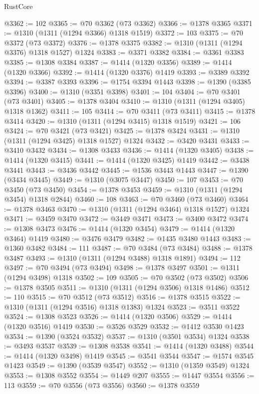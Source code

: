 \begin{lexlean}{RustCore}
\begin{coremodule}
@3362 := 102
@3365 := @70 @3362 (@73 @3362)
@3366 := @1378 @3365
@3371 := @1310 (@1311 (@1294 @3366) @1318 @1519)
@3372 := 103
@3375 := @70 @3372 (@73 @3372)
@3376 := @1378 @3375
@3382 := @1310 (@1311 (@1294 @3376) @1318 @1527) @1324
@3383 := @3371 @3382
@3384 := @3361 @3383
@3385 := @1308 @3384
@3387 := @1414 (@1320 @3356)
@3389 := @1414 (@1320 @3366)
@3392 := @1414 (@1320 @3376) @1419
@3393 := @3389 @3392
@3394 := @3387 @3393
@3396 := @1754 @3394 @1443
@3398 := @1390 (@3385 @3396)
@3400 := @1310 (@3351 @3398)
@3401 := 104
@3404 := @70 @3401 (@73 @3401)
@3405 := @1378 @3404
@3410 := @1310 (@1311 (@1294 @3405) @1318 @1362)
@3411 := 105
@3414 := @70 @3411 (@73 @3411)
@3415 := @1378 @3414
@3420 := @1310 (@1311 (@1294 @3415) @1318 @1519)
@3421 := 106
@3424 := @70 @3421 (@73 @3421)
@3425 := @1378 @3424
@3431 := @1310 (@1311 (@1294 @3425) @1318 @1527) @1324
@3432 := @3420 @3431
@3433 := @3410 @3432
@3434 := @1308 @3433
@3436 := @1414 (@1320 @3405)
@3438 := @1414 (@1320 @3415)
@3441 := @1414 (@1320 @3425) @1419
@3442 := @3438 @3441
@3443 := @3436 @3442
@3445 := @1536 @3443 @1443
@3447 := @1390 (@3434 @3445)
@3449 := @1310 (@3075 @3447)
@3450 := 107
@3453 := @70 @3450 (@73 @3450)
@3454 := @1378 @3453
@3459 := @1310 (@1311 (@1294 @3454) @1318 @2844)
@3460 := 108
@3463 := @70 @3460 (@73 @3460)
@3464 := @1378 @3463
@3470 := @1310 (@1311 (@1294 @3464) @1318 @1527) @1324
@3471 := @3459 @3470
@3472 := @3449 @3471
@3473 := @3400 @3472
@3474 := @1308 @3473
@3476 := @1414 (@1320 @3454)
@3479 := @1414 (@1320 @3464) @1419
@3480 := @3476 @3479
@3482 := @1435 @3480 @1443
@3483 := @1360 @3482
@3484 := 111
@3487 := @70 @3484 (@73 @3484)
@3488 := @1378 @3487
@3493 := @1310 (@1311 (@1294 @3488) @1318 @1891)
@3494 := 112
@3497 := @70 @3494 (@73 @3494)
@3498 := @1378 @3497
@3501 := @1311 (@1294 @3498) @1318
@3502 := 109
@3505 := @70 @3502 (@73 @3502)
@3506 := @1378 @3505
@3511 := @1310 (@1311 (@1294 @3506) @1318 @1486)
@3512 := 110
@3515 := @70 @3512 (@73 @3512)
@3516 := @1378 @3515
@3522 := @1310 (@1311 (@1294 @3516) @1318 @1383) @1324
@3523 := @3511 @3522
@3524 := @1308 @3523
@3526 := @1414 (@1320 @3506)
@3529 := @1414 (@1320 @3516) @1419
@3530 := @3526 @3529
@3532 := @1412 @3530 @1423
@3534 := @1390 (@3524 @3532)
@3537 := @1310 (@3501 @3534) @1324
@3538 := @3493 @3537
@3539 := @1308 @3538
@3541 := @1414 (@1320 @3488)
@3544 := @1414 (@1320 @3498) @1419
@3545 := @3541 @3544
@3547 := @1574 @3545 @1423
@3549 := @1390 (@3539 @3547)
@3552 := @1310 (@1359 @3549) @1324
@3553 := @1308 @3552
@3554 := @1449 @207
@3555 := @1447 @3554
@3556 := 113
@3559 := @70 @3556 (@73 @3556)
@3560 := @1378 @3559

\end{coremodule}
\end{lexlean}
